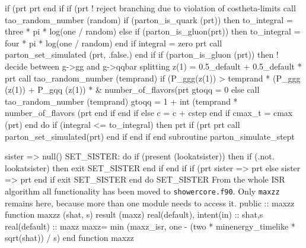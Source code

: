           if (prt%
             prt%
          end if
          if (prt%
             ! reject branching due to violation of costheta-limits
             call tao_random_number (random)
             if (parton_is_quark (prt)) then
                to_integral = three * pi * log(one / random)
             else if (parton_is_gluon(prt)) then
                to_integral = four * pi * log(one / random)
             end if
             integral = zero
             prt%
             call parton_set_simulated (prt, .false.)
          end if
          if (parton_is_gluon (prt)) then
             ! decide between g->gg and g->qqbar splitting
             z(1) = 0.5_default + 0.5_default * prt%
             call tao_random_number (temprand)
             if (P_ggg(z(1)) > temprand * (P_ggg (z(1)) + P_gqq (z(1)) * &
                  number_of_flavors(prt%
                gtoqq = 0
             else
                call tao_random_number (temprand)
                gtoqq = 1 + int (temprand * number_of_flavors (prt%
             end if
          end if
       else
          c = c + cstep
       end if
       cmax_t = cmax (prt)
    end do
    if (integral <= to_integral) then
       prt%
       if (prt%
          prt%
          call parton_set_simulated(prt)
       end if
    end if
  end subroutine parton_simulate_stept

\eatline
\nwendcode{}\nwdocspar
\nwenddocs{}\endmoddef
sister => null()
SET_SISTER: do
   if (present (lookatsister)) then
      if (.not. lookatsister) then
         exit SET_SISTER
      end if
   end if
   if (prt%
      sister => prt%
   else
      sister => prt%
   end if
   exit SET_SISTER
end do SET_SISTER
\nwendcode{}\nwdocspar
\nwenddocs{}From the whole ISR algorithm all functionality has been moved to
{\tt{}shower{}core.f90}. Only {\tt{}maxzz} remains here, because more than
one module needs to access it.
\nwenddocs{}\plusendmoddef
  public :: maxzz
\nwendcode{}\plusendmoddef
  function maxzz (shat, s) result (maxz)
    real(default), intent(in) :: shat,s
    real(default) :: maxz
    maxz= min (maxz_isr, one - (two * minenergy_timelike * sqrt(shat)) / s)
  end function maxzz

